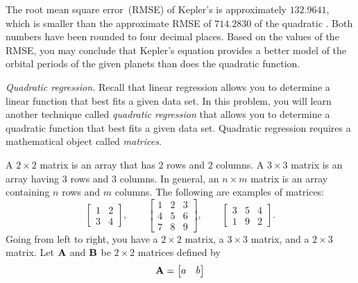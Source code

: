 \documentclass[a4paper,oneside,12pt]{article}
\begin{document}
\begin{problem}
{\begin{solution}
The root mean square error~(RMSE) of Kepler's
 is approximately $132.9641$,
which is smaller than the approximate RMSE of $714.2830$ of the
quadratic .  Both numbers
have been rounded to four decimal places.  Based on the values of the
RMSE, you may conclude that Kepler's equation provides a better model
of the orbital periods of the given planets than does the quadratic
function.
\end{solution}
}{}

\item\emph{Quadratic regression.}
  Recall that linear regression allows you to determine a linear
  function that best fits a given data set.  In this problem, you will
  learn another technique called \emph{quadratic regression} that
  allows you to determine a quadratic function that best fits a given
  data set.  Quadratic regression requires a mathematical object
  called \emph{matrices}.
  \begin{packedenum}
  \item\label{subprob:quadratic_applications:matrix_sum}
    A $2 \times 2$ matrix is an array that has $2$ rows and $2$
    columns.  A $3 \times 3$ matrix is an array having $3$ rows and
    $3$ columns.  In general, an $n \times m$ matrix is an array
    containing $n$ rows and $m$ columns.  The following are examples
    of matrices:
    \[
    \begin{bmatrix}
    1 & 2 \\
    3 & 4
    \end{bmatrix},
    \qquad
    \begin{bmatrix}
    1 & 2 & 3 \\
    4 & 5 & 6 \\
    7 & 8 & 9
    \end{bmatrix},
    \qquad
    \begin{bmatrix}
    3 & 5 & 4 \\
    1 & 9 & 2
    \end{bmatrix}.
    \]
    Going from left to right, you have a $2 \times 2$ matrix, a
    $3 \times 3$ matrix, and a $2 \times 3$ matrix.  Let $\textbf{A}$ and
    $\textbf{B}$ be $2 \times 2$ matrices defined by
    \begin{equation}
    \label{eqn:quadratic_applications:2x2_matrices}
    \textbf{A}
    =
    \begin{bmatrix}
    a & b \\

\end{bmatrix}
\end{equation}
\end{packedenum}
\end{problem}
\end{document}
